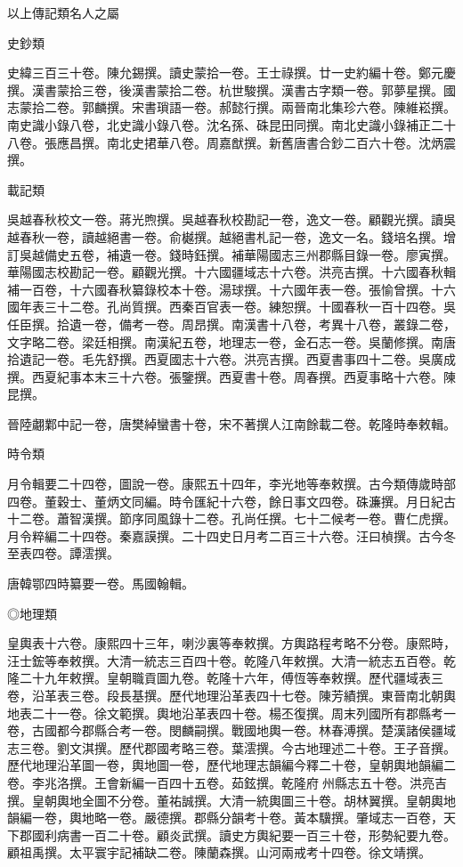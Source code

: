 \begin{pinyinscope}
以上傳記類名人之屬

史鈔類

史緯三百三十卷。陳允錫撰。讀史蒙拾一卷。王士祿撰。廿一史約編十卷。鄭元慶撰。漢書蒙拾三卷，後漢書蒙拾二卷。杭世駿撰。漢書古字類一卷。郭夢星撰。國志蒙拾二卷。郭麟撰。宋書瑣語一卷。郝懿行撰。兩晉南北集珍六卷。陳維崧撰。南史識小錄八卷，北史識小錄八卷。沈名孫、硃昆田同撰。南北史識小錄補正二十八卷。張應昌撰。南北史捃華八卷。周嘉猷撰。新舊唐書合鈔二百六十卷。沈炳震撰。

載記類

吳越春秋校文一卷。蔣光煦撰。吳越春秋校勘記一卷，逸文一卷。顧觀光撰。讀吳越春秋一卷，讀越絕書一卷。俞樾撰。越絕書札記一卷，逸文一名。錢培名撰。增訂吳越備史五卷，補遺一卷。錢時鈺撰。補華陽國志三州郡縣目錄一卷。廖寅撰。華陽國志校勘記一卷。顧觀光撰。十六國疆域志十六卷。洪亮吉撰。十六國春秋輯補一百卷，十六國春秋纂錄校本十卷。湯球撰。十六國年表一卷。張愉曾撰。十六國年表三十二卷。孔尚質撰。西秦百官表一卷。練恕撰。十國春秋一百十四卷。吳任臣撰。拾遺一卷，備考一卷。周昂撰。南漢書十八卷，考異十八卷，叢錄二卷，文字略二卷。梁廷相撰。南漢紀五卷，地理志一卷，金石志一卷。吳蘭修撰。南唐拾遺記一卷。毛先舒撰。西夏國志十六卷。洪亮吉撰。西夏書事四十二卷。吳廣成撰。西夏紀事本末三十六卷。張鑒撰。西夏書十卷。周春撰。西夏事略十六卷。陳昆撰。

晉陸翽鄴中記一卷，唐樊綽蠻書十卷，宋不著撰人江南餘載二卷。乾隆時奉敕輯。

時令類

月令輯要二十四卷，圖說一卷。康熙五十四年，李光地等奉敕撰。古今類傳歲時部四卷。董穀士、董炳文同編。時令匯紀十六卷，餘日事文四卷。硃濂撰。月日紀古十二卷。蕭智漢撰。節序同風錄十二卷。孔尚任撰。七十二候考一卷。曹仁虎撰。月令粹編二十四卷。秦嘉謨撰。二十四史日月考二百三十六卷。汪曰楨撰。古今冬至表四卷。譚澐撰。

唐韓鄂四時纂要一卷。馬國翰輯。

◎地理類

皇輿表十六卷。康熙四十三年，喇沙裏等奉敕撰。方輿路程考略不分卷。康熙時，汪士鋐等奉敕撰。大清一統志三百四十卷。乾隆八年敕撰。大清一統志五百卷。乾隆二十九年敕撰。皇朝職貢圖九卷。乾隆十六年，傅恆等奉敕撰。歷代疆域表三卷，沿革表三卷。段長基撰。歷代地理沿革表四十七卷。陳芳績撰。東晉南北朝輿地表二十一卷。徐文範撰。輿地沿革表四十卷。楊丕復撰。周末列國所有郡縣考一卷，古國都今郡縣合考一卷。閔麟嗣撰。戰國地輿一卷。林春溥撰。楚漢諸侯疆域志三卷。劉文淇撰。歷代郡國考略三卷。葉澐撰。今古地理述二十卷。王子音撰。歷代地理沿革圖一卷，輿地圖一卷，歷代地理志韻編今釋二十卷，皇朝輿地韻編二卷。李兆洛撰。王會新編一百四十五卷。茹鉉撰。乾隆府州縣志五十卷。洪亮吉撰。皇朝輿地全圖不分卷。董祐誠撰。大清一統輿圖三十卷。胡林翼撰。皇朝輿地韻編一卷，輿地略一卷。嚴德撰。郡縣分韻考十卷。黃本驥撰。肇域志一百卷，天下郡國利病書一百二十卷。顧炎武撰。讀史方輿紀要一百三十卷，形勢紀要九卷。顧祖禹撰。太平寰宇記補缺二卷。陳蘭森撰。山河兩戒考十四卷。徐文靖撰。


\end{pinyinscope}
